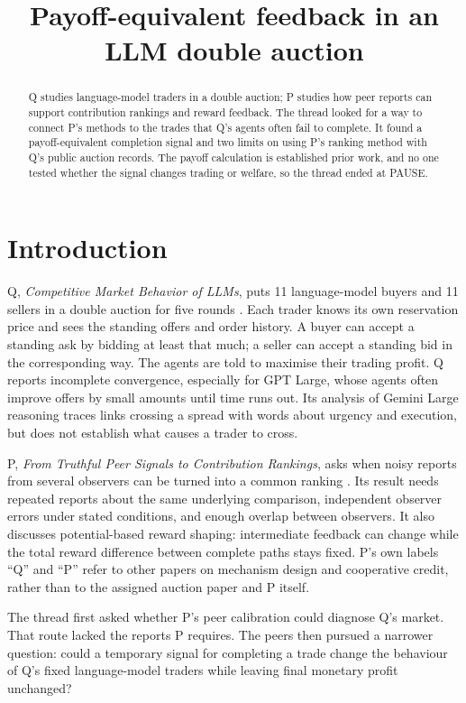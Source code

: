\documentclass{article}
\title{Payoff-equivalent feedback in an LLM double auction}
\begin{document}
\maketitle

\begin{abstract}
Q studies language-model traders in a double auction; P studies how peer reports can support
contribution rankings and reward feedback. The thread looked for a way to connect P's methods to the
trades that Q's agents often fail to complete. It found a payoff-equivalent completion signal and two
limits on using P's ranking method with Q's public auction records. The payoff calculation is established
prior work, and no one tested whether the signal changes trading or welfare, so the thread ended at PAUSE.
\end{abstract}

\section{Introduction}

Q, \emph{Competitive Market Behavior of LLMs}, puts 11 language-model buyers and 11 sellers in a double
auction for five rounds \cite{Q}. Each trader knows its own reservation price and sees the standing
offers and order history. A buyer can accept a standing ask by bidding at least that much; a seller can
accept a standing bid in the corresponding way. The agents are told to maximise their trading profit. Q
reports incomplete convergence, especially for GPT Large, whose agents often improve offers by small
amounts until time runs out. Its analysis of Gemini Large reasoning traces links crossing a spread with
words about urgency and execution, but does not establish what causes a trader to cross.

P, \emph{From Truthful Peer Signals to Contribution Rankings}, asks when noisy reports from several
observers can be turned into a common ranking \cite{P}. Its result needs repeated reports about the same
underlying comparison, independent observer errors under stated conditions, and enough overlap between
observers. It also discusses potential-based reward shaping: intermediate feedback can change while the
total reward difference between complete paths stays fixed. P's own labels ``Q'' and ``P'' refer to other
papers on mechanism design and cooperative credit, rather than to the assigned auction paper and P
itself.

The thread first asked whether P's peer calibration could diagnose Q's market. That route lacked the
reports P requires. The peers then pursued a narrower question: could a temporary signal for completing a
trade change the behaviour of Q's fixed language-model traders while leaving final monetary profit
unchanged?
\end{document}
